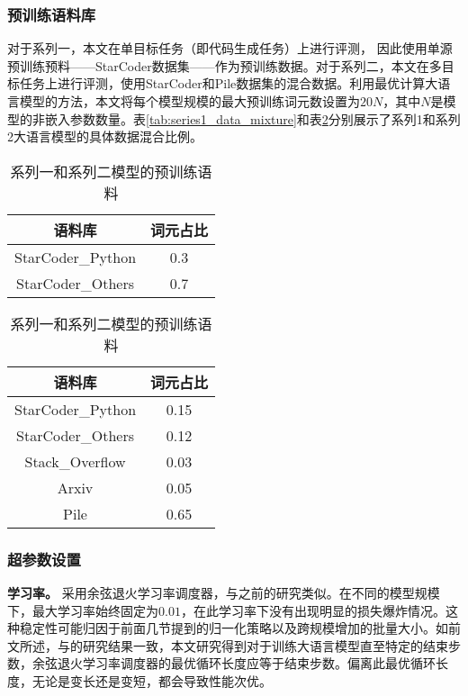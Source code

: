 \subsubsection{预训练语料库}
对于系列一，本文在单目标任务（即代码生成任务）上进行评测， 因此使用单源预训练预料——StarCoder数据集\citep{li2023starcoder}——作为预训练数据。对于系列二，本文在多目标任务上进行评测，使用StarCoder和Pile数据集\citep{gao2020pile}的混合数据。利用最优计算大语言模型的方法\citep{hoffmann2022training}，本文将每个模型规模的最大预训练词元数设置为\(20N\)，其中\(N\)是模型的非嵌入参数数量。表\ref{tab:series1_data_mixture}和表\ref{tab:series2_data_mixture}分别展示了系列1和系列2大语言模型的具体数据混合比例。

\begin{table}
    \centering
    \caption{系列一和系列二模型的预训练语料}
    \begin{minipage}{0.45\linewidth}
        \centering
        \begin{tabular}{c|c}
        \toprule
           语料库   &  词元占比 \\
        \midrule
        StarCoder\_Python &  0.3\\
        StarCoder\_Others &  0.7\\
        \bottomrule
        \end{tabular}
        \label{tab:series1_data_mixture}
    \end{minipage}
    \hfill
    \begin{minipage}{0.45\linewidth}
        \centering
        \begin{tabular}{c|c}
        \toprule
           语料库   &  词元占比 \\
        \midrule
        StarCoder\_Python &  0.15\\
        StarCoder\_Others &  0.12\\
        Stack\_Overflow & 0.03 \\
        Arxiv & 0.05 \\
        Pile & 0.65 \\
        \bottomrule
        \end{tabular}
        \label{tab:series2_data_mixture}
    \end{minipage}
\end{table}

\subsubsection{超参数设置}
\label{app:hyperparameters}
\textbf{学习率。} 采用余弦退火学习率调度器，与之前的研究\citep{touvron2023llama, touvron2023llama2, hoffmann2022training}类似。在不同的模型规模下，最大学习率始终固定为\(0.01\)，在此学习率下没有出现明显的损失爆炸情况。这种稳定性可能归因于前面几节提到的归一化策略\citep{yang2022tensor}以及跨规模增加的批量大小。如前文所述，与\citet{hoffmann2022training}的研究结果一致，本文研究得到对于训练大语言模型直至特定的结束步数，余弦退火学习率调度器的最优循环长度应等于结束步数。偏离此最优循环长度，无论是变长还是变短，都会导致性能次优。

